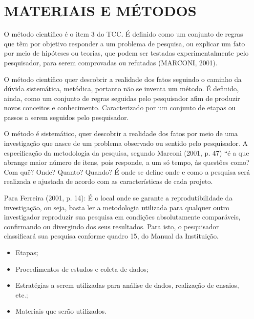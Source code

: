 \chapter{MATERIAIS E MÉTODOS}
\label{materiaisemetodos}

O método cientifico é o item 3 do TCC. É definido como um conjunto de regras que têm por objetivo responder a um problema de pesquisa, ou explicar um fato por meio de hipóteses ou teorias, que podem ser testadas experimentalmente pelo pesquisador, para serem comprovadas ou refutadas (MARCONI, 2001).

O método científico quer descobrir a realidade dos fatos seguindo o caminho da dúvida sistemática, metódica, portanto não se inventa um método. É definido, ainda, como um conjunto de regras seguidas pelo pesquisador afim de produzir novos conceitos e conhecimento. Caracterizado por um conjunto de etapas ou passos a serem seguidos pelo pesquisador.

O método é sistemático, quer descobrir a realidade dos fatos por meio de uma investigação que nasce de um problema observado ou sentido pelo pesquisador. A especificação da metodologia da pesquisa, segundo Marconi (2001, p. 47) “é a que abrange maior número de itens, pois responde, a um só tempo, às questões como? Com quê? Onde? Quanto? Quando? É onde se define onde e como a pesquisa será realizada e ajustada de acordo com as características de cada projeto. 

Para Ferreira (2001, p. 14): É o local onde se garante a reprodutibilidade da investigação, ou seja, basta ler a metodologia utilizada para qualquer outro investigador reproduzir sua pesquisa em condições absolutamente comparáveis, confirmando ou divergindo dos seus resultados. Para isto, o pesquisador classificará sua pesquisa conforme quadro 15, do Manual da Instituição.

\begin{itemize}
    \item Etapas;
    \item Procedimentos de estudos e coleta de dados;   
    \item Estratégias a serem utilizadas para análise de dados, realização de ensaios, etc.;
		\item Materiais que serão utilizados.
\end{itemize}